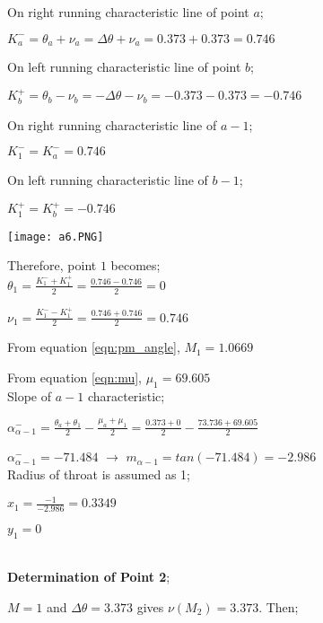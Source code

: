 \begin{appendices}
\begin{minipage}{0.65\textwidth}
	On right running characteristic line of point $a$;
	
	$K_a^- = \theta_a+\nu_a = \Delta\theta + \nu_a = 0.373+0.373=0.746$
	
	On left running characteristic line of point $b$;
	
	$K_b^+ = \theta_b-\nu_b = -\Delta\theta - \nu_b = -0.373-0.373=-0.746$
	
	On right running characteristic line of $a-1$;
	
	$K_1^- = K_a^- = 0.746$
	
	On left running characteristic line of $b-1$;
	
	$K_1^+ = K_b^+ = -0.746$
		
\end{minipage}
\begin{minipage}{0.35\textwidth}
	\texttt{[image: a6.PNG]}
\end{minipage}%
\noindent

\pagebreak

Therefore, point $1$ becomes;\\

$\theta_1 = \frac{K_1^-+K_1^+}{2}=\frac{0.746-0.746}{2}=0$

$\nu_1=\frac{K_1^--K_1^+}{2}=\frac{0.746+0.746}{2}=0.746$

From equation \eqref{eqn:pm_angle}, $M_1=1.0669$

From equation \eqref{eqn:mu}, $\mu_1=69.605$\\

Slope of $a-1$ characteristic;

${\alpha}^{-}_{\alpha-1} = \frac{\theta_a+\theta_1}{2}-\frac{\mu_a+\mu_1}{2} = \frac{0.373+0}{2}-\frac{73.736+69.605}{2}$

${\alpha}_{\alpha-1}^{-} = -71.484 $ $\rightarrow$  $m_{\alpha-1} = tan(-71.484) = -2.986$\\

Radius of throat is assumed as 1;\\

{\color{magenta}
$x_1 = \frac{-1}{-2.986} = 0.3349 $

$y_1 = 0$
}\\

\noindent\textbf{Determination of Point 2};\\

\begin{minipage}{0.65\textwidth}
	
$M=1$ and $\Delta\theta = 3.373$ gives $\nu(M_2)=3.373$. Then;


\end{minipage}
\end{appendices}
